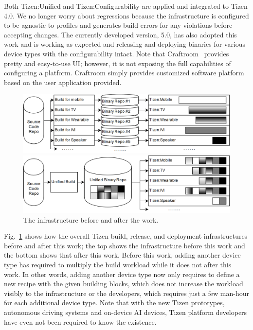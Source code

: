 
Both Tizen:Unified and Tizen:Configurability are applied and integrated to Tizen 4.0.
We no longer worry about regressions because the infrastructure is configured to be agnostic to profiles and generates build errors for any violations before accepting changes.
The currently developed version, 5.0, has also adopted this work and is working as expected and releasing and deploying binaries for various device types with the configurability intact.
Note that Craftroom~\cite{5CraftroomURL} provides pretty and easy-to-use UI; however, it is not exposing the full capabilities of configuring a platform.
Craftroom simply provides customized software platform based on the user application provided.

\begin{figure}
\centering
  \includegraphics[width=0.95\columnwidth]{figures/TizenInfraBefore.png}
  
  \vspace{0.1cm}
  
  \includegraphics[width=0.95\columnwidth]{figures/TizenInfraAfter.png}
\caption{The infrastructure before and after the work.}
\label{FIG_TZN_BR_INF}
\end{figure}

Fig.~\ref{FIG_TZN_BR_INF} shows how the overall Tizen build, release, and deployment infrastructures before and after this work;
the top shows the infrastructure before this work and the bottom shows that after this work.
Before this work, adding another device type has required to multiply the build workload while it does not after this work.
In other words, adding another device type now only requires to define a new recipe with the given building blocks, which does not increase the workload visibly to the infrastructure or the developers, which requires just a few man-hour for each additional device type.
Note that with the new Tizen prototypes, autonomous driving systems and on-device AI devices, Tizen platform developers have even not been required to know the existence.


